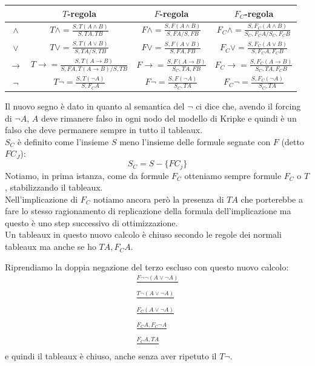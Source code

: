 \documentclass[a4paper,12pt, oneside]{book}
\begin{document}
\begin{table}[H]
  \centering
  \begin{tabular}{c||c|c|c}
    & {\small{$T$-regola}}& {\small{$F$-regola}} & {\small{$F_C$-regola}}\\
    \hline
    \hline
    $\land$ & $T\land=\frac{S,T(A\land B)}{S,TA,TB}$&
              $F\land=\frac{S,F(A\land B)}{S,FA/S,FB}$&
              $F_C\land=\frac{S,F_C(A\land B)}{S_C,F_CA/S_C,F_CB}$\\ 
    \hline
    $\lor$ & $T\lor=\frac{S,T(A\lor B)}{S,TA/S,TB}$&
                        $F\lor=\frac{S,F(A\lor B)}{S,FA,FB}$&
                        $F_C\lor=\frac{S,F_C(A\lor B)}{S,F_CA,F_CB}$\\
    \hline
    $\to$ & $T\to=\frac{S,T(A\to B)}{S,FA, T(A\to B)/S,TB}$&
                        $F\to=\frac{S,F(A\to B)}{S_C,TA,FB}$&
                        $F_C\to=\frac{S,F_C(A\to B)}{S_C,TA,F_CB}$\\
    \hline
    $\neg$ & $T\neg=\frac{S,T(\neg A)}{S,F_CA}$&
                        $F\neg=\frac{S,F(\neg A)}{S_C,TA}$&
                        $F_C\neg=\frac{S,F_C(\neg A)}{S_C,TA}$\\
    \hline
  \end{tabular}
\end{table}
Il nuovo segno è dato in quanto al semantica del $\neg$ ci dice che, avendo il
forcing di $\neg A$, $A$ deve rimanere falso in ogni nodo del modello di Kripke
e quindi è un falso che deve permanere sempre in tutto il tableaux.\\
$S_C$ è definito come l'insieme $S$ meno l'insieme delle formule segnate con
$F$ (detto $FC_J$): 
\[S_C=S-\{FC_j\}\]
Notiamo, in prima istanza, come da formule $F_C$ otteniamo sempre formule $F_C$
o $T$, stabilizzando il tableaux.\\
Nell'implicazione di $F_C$ notiamo ancora però la presenza di $TA$ che
porterebbe a fare lo stesso ragionamento di replicazione della formula
dell'implicazione ma questo è uno step successivo di ottimizzazione.\\
Un tableaux in questo nuovo calcolo è chiuso secondo le regole dei normali
tableaux ma anche se ho $TA,F_CA$.
\begin{esempio}
  Riprendiamo la doppia negazione del terzo escluso con questo nuovo calcolo:
  \begin{gather*}
    \frac{F\neg \neg (A\lor \neg A)}{}\\
    \frac{T\neg(A\lor \neg A)}{}\\
    \frac{F_C (A\lor\neg A)}{}\\
    \frac{F_C A, F_C\neg A}{}\\
    \frac{F_C A, TA}{}
  \end{gather*}
  e quindi il tableaux è chiuso, anche senza aver ripetuto il $T\neg$.
\end{esempio}
\end{document}
